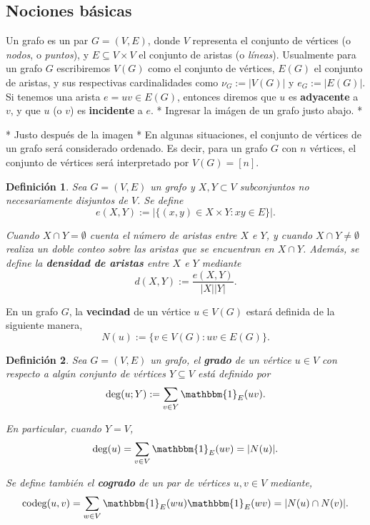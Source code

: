 \documentclass{article}[14pts]
\newcommand{\hh}[1]{{\color{red} * #1 *}}
\newtheorem{definicion}{Definición}
\newcommand{\cod}{\mathrm{codeg}}
\begin{document}
\subsection{Nociones básicas}

Un grafo es un par $G = (V,E)$, donde $V$ representa el conjunto de vértices (o \emph{nodos}, o \emph{puntos}), y $E\subseteq V\times V$ el conjunto de aristas (o \emph{líneas}). Usualmente para un grafo $G$ escribiremos $V(G)$ como el conjunto de vértices, $E(G)$ el conjunto de aristas, y sus respectivas cardinalidades como $\nu_G := |V(G)|$ y $e_G := |E(G)|$. Si tenemos una arista $e = uv\in E(G)$, entonces diremos que $u$ es \textbf{adyacente} a $v$, y que $u$ (o $v$) es \textbf{incidente} a $e$. \hh{Ingresar la imágen de un grafo justo abajo.}

\hh{Justo después de la imagen} En algunas situaciones, el conjunto de vértices de un grafo será considerado ordenado. Es decir, para un grafo $G$ con $n$ vértices, el conjunto de vértices será interpretado por $V(G) = [n]$.

\begin{definicion} \label{e(X,Y)}
    Sea $G = (V,E)$ un grafo y $X,Y\subset V$ subconjuntos no necesariamente disjuntos de $V$. Se define
    \begin{equation} \label{e(X,Y)}
     e(X,Y) := \Big|\lbrace (x,y)\in X\times Y : xy\in E\rbrace\Big|.
    \end{equation}
    
    Cuando $X\cap Y = \emptyset$ cuenta el número de aristas entre $X$ e $Y$, y cuando $X\cap Y\not=\emptyset$ realiza un doble conteo sobre las aristas que se encuentran en $X\cap Y$.
    Además, se define la \textbf{densidad de aristas} entre $X$ e $Y$ mediante
    \begin{equation}
        d(X,Y) := \frac{e(X,Y)}{|X||Y|}.
    \end{equation} 
\end{definicion}

En un grafo $G$, la \textbf{vecindad} de un vértice $u\in V(G)$ estará definida de la siguiente manera,
\begin{equation} \label{vecindad}
    N(u) := \lbrace v\in V(G) : uv\in E(G)\rbrace.
\end{equation}

\begin{definicion}
    Sea $G = (V,E)$ un grafo, el \textbf{grado} de un vértice $u\in V$ con respecto a algún conjunto de vértices $Y\subseteq V$ está definido por
    \[ \deg(u;Y) := \sum_{v\in Y} \mathbbm{1}_{E}(uv). \]

    En particular, cuando $Y = V$,
    \[ \deg(u) = \sum_{v\in V} \mathbbm{1}_{E}(uv) = |N(u)|.\]

    Se define también el \textbf{cogrado} de un par de vértices $u,v\in V$ mediante,
    \[ \cod(u,v) = \sum_{w\in V} \mathbbm{1}_{E}(wu) \mathbbm{1}_{E}(wv)=|N(u)\cap N(v)|.\]
\end{definicion}
\end{document}
